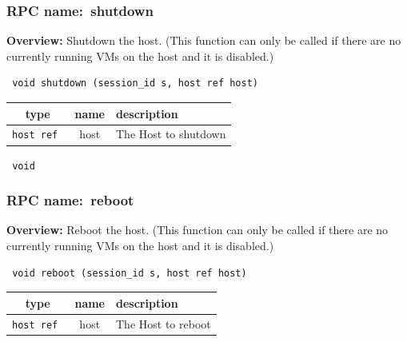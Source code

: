\vspace{0.3cm}
\vspace{0.3cm}
\vspace{0.3cm}
\subsubsection{RPC name:~shutdown}

{\bf Overview:} 
Shutdown the host. (This function can only be called if there are no currently running VMs on the host and it is disabled.)

\begin{verbatim} void shutdown (session_id s, host ref host)\end{verbatim}



 
\vspace{0.3cm}
\begin{tabular}{|c|c|p{7cm}|}
 \hline
{\bf type} & {\bf name} & {\bf description} \\ \hline
{\tt host ref } & host & The Host to shutdown \\ \hline 

\end{tabular}

\vspace{0.3cm}

{\tt 
void
}



\vspace{0.3cm}
\vspace{0.3cm}
\vspace{0.3cm}
\subsubsection{RPC name:~reboot}

{\bf Overview:} 
Reboot the host. (This function can only be called if there are no currently running VMs on the host and it is disabled.)

\begin{verbatim} void reboot (session_id s, host ref host)\end{verbatim}



 
\vspace{0.3cm}
\begin{tabular}{|c|c|p{7cm}|}
 \hline
{\bf type} & {\bf name} & {\bf description} \\ \hline
{\tt host ref } & host & The Host to reboot \\ \hline 

\end{tabular}

